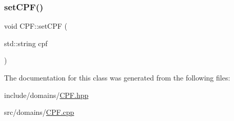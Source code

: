 \subsubsection{\texorpdfstring{setCPF()}{setCPF()}}
{\footnotesize\ttfamily void C\+P\+F\+::set\+C\+PF (\begin{DoxyParamCaption}\item[{std\+::string}]{cpf }\end{DoxyParamCaption})}



The documentation for this class was generated from the following files\+:\begin{DoxyCompactItemize}
\item 
include/domains/\mbox{\hyperlink{_c_p_f_8hpp}{C\+P\+F.\+hpp}}\item 
src/domains/\mbox{\hyperlink{_c_p_f_8cpp}{C\+P\+F.\+cpp}}\end{DoxyCompactItemize}
